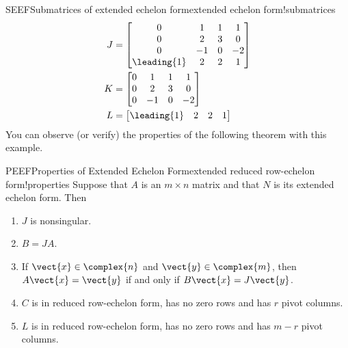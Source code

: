 \begin{example}{SEEF}{Submatrices of extended echelon form}{extended echelon form!submatrices}
\begin{align*}
%
J&=
\begin{bmatrix}
0 & 1 & 1 & 1\\
0 & 2 & 3 & 0 \\
0 & -1 & 0 & -2 \\
\leading{1} & 2 & 2 & 1
\end{bmatrix}\\
%
K&=
\begin{bmatrix}
0 & 1 & 1 & 1\\
0 & 2 & 3 & 0 \\
0 & -1 & 0 & -2
\end{bmatrix}\\
%
L&=
\begin{bmatrix}
\leading{1} & 2 & 2 & 1
\end{bmatrix}
\end{align*}
%
You can observe (or verify) the properties of the following theorem with this example.
\end{example}
%
%
\begin{theorem}{PEEF}{Properties of Extended Echelon Form}{extended reduced row-echelon form!properties}
Suppose that $A$ is an $m\times n$ matrix and that $N$ is its extended echelon form.  Then
%
\begin{enumerate}
\item $J$ is nonsingular.
\item $B=JA$.
\item If $\vect{x}\in\complex{n}$ and $\vect{y}\in\complex{m}$, then $A\vect{x}=\vect{y}$ if and only if $B\vect{x}=J\vect{y}$.
\item $C$ is in reduced row-echelon form, has no zero rows and has $r$ pivot columns.
\item $L$ is in reduced row-echelon form, has no zero rows and has $m-r$ pivot columns.
\end{enumerate}
%
\end{theorem}
%
